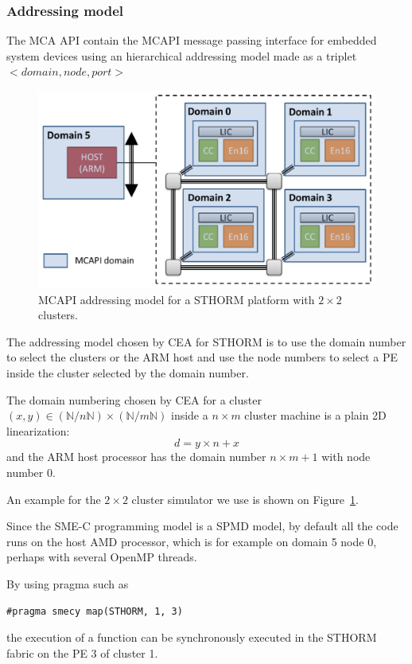 \documentclass[a4paper]{article}
\begin{document}
\subsubsection{Addressing model}
\label{sec:addressing-model}

The MCA API contain the MCAPI message passing interface for embedded
system devices using an hierarchical addressing model made as a triplet
$<domain,node,port>$

\begin{figure}
  \includegraphics[width=\hsize]{figures/STHORM_MCAPI_mapping}
  \caption{MCAPI addressing model for a STHORM platform with $2\times2$
    clusters.}
  \label{fig:STHORM_MCAPI_mapping}
\end{figure}

The addressing model chosen by CEA for STHORM is to use the domain number
to select the clusters or the ARM host and use the node numbers to select
a PE inside the cluster selected by the domain number.

The domain numbering chosen by CEA for a cluster $(x,y)\in
(\mathbb{N}/n\mathbb{N})\times(\mathbb{N}/m\mathbb{N})$ inside a $n\times
m$ cluster machine is a plain 2D linearization:
\[
d = y \times n + x
\]
and the ARM host processor has the domain number $n\times m + 1$ with node
number 0.

An example for the $2\times2$ cluster simulator we use is shown on
Figure~\ref{fig:STHORM_MCAPI_mapping}.

Since the SME-C programming model is a SPMD model, by default all the code
runs on the host AMD processor, which is for example on domain 5 node 0,
perhaps with several OpenMP threads.

By using pragma such as
\begin{lstlisting}
#pragma smecy map(STHORM, 1, 3)
\end{lstlisting}
the execution of a function can be synchronously executed in the STHORM
fabric on the PE 3 of cluster 1.
\end{document}
